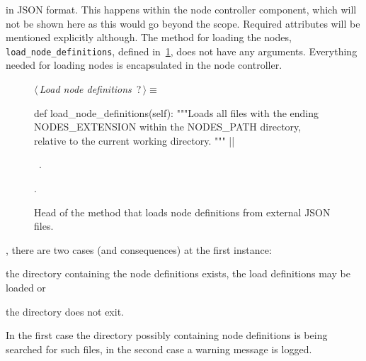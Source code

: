 \documentclass[%
    a4paper,    %
    justified,  %
    nobib,      %
    openany     %
]{tufte-book}
\begin{document}
 in JSON format.
This happens within the node controller component, which will not be shown here
as this would go beyond the scope. Required attributes will be mentioned
explicitly although. The method for loading the nodes,
\texttt{load_node_definitions}, defined
in~\cref{lst:load-node-definitions}, does not have any arguments. Everything
needed for loading nodes is encapsulated in the node controller.

\begin{figure}[h]
  \begin{flushleft} \small
\begin{minipage}{\linewidth}\label{scrap3}\raggedright\small
{} $\langle\,${\itshape Load node definitions}\nobreak\ {\footnotesize {?}}$\,\rangle\equiv$
\vspace{-1ex}
\begin{pythoncode}
def load_node_definitions(self):
    """Loads all files with the ending NODES_EXTENSION
    within the NODES_PATH directory, relative to
    the current working directory.
    """
|\NWsep|
\end{pythoncode}
\vspace{1.5ex}
\footnotesize
\begin{list}{}{\setlength{\itemsep}{-\parsep}\setlength{\itemindent}{-\leftmargin}}
\item \NWtxtMacroDefBy\ .
\item {\NWtxtMacroNoRef}.

\item{}
\end{list}
\end{minipage}\vspace{4ex}
\end{flushleft}
\caption{Head of the method that loads node definitions from external JSON
    files.}
  \label{lst:load-node-definitions}
\end{figure}

\vspace*{-2\baselineskip}
, there are two cases (and
consequences) at the first instance:
\begin{enumerate*}
  \item the directory containing the node definitions exists, the load
    definitions may be loaded or
  \item the directory does not exit.
\end{enumerate*}
In the first case the directory possibly containing node definitions is being
searched for such files, in the second case a warning message is logged.
\end{document}
